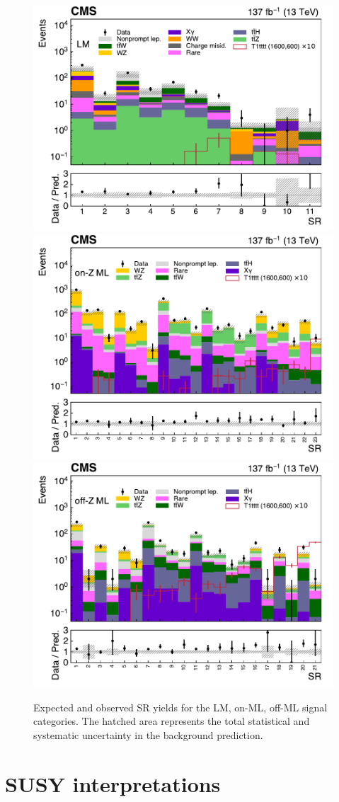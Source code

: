 \begin{figure}[!hbtp]
\centering
\includegraphics[width=.50\textwidth]{figs/ssp/SRLM_TOTAL.pdf}
\includegraphics[width=.50\textwidth]{figs/ssp/SRMLONZ_TOTAL.pdf}
\includegraphics[width=.50\textwidth]{figs/ssp/SRMLOFFZ_TOTAL.pdf}
\\
\caption{Expected and observed SR yields for the LM, on-\PZ ML, off-\PZ ML signal categories. 
The hatched area represents the total statistical and systematic uncertainty in the background prediction.
}
\label{fig:SRrun2b}
\end{figure}


                               

\section{SUSY interpretations}
\label{sec:ssinterpretations}

